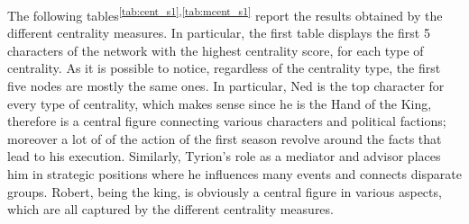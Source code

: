 \documentclass[10pt,twocolumn,letterpaper]{article}
\begin{document}
The following tables\textsuperscript{\ref{tab:cent_s1},\ref{tab:mcent_s1}} report the results obtained by the different centrality measures. In particular, the first table displays the first 5 characters of the network with the highest centrality score, for each type of centrality. As it is possible to notice, regardless of the centrality type, the first five nodes are mostly the same ones. In particular, Ned is the top character for every type of centrality, which makes sense since he is the Hand of the King, therefore is a central figure connecting various characters and political factions; moreover a lot of of the action of the first season revolve around the facts that lead to his execution. Similarly, Tyrion's role as a mediator and advisor places him in strategic positions where he influences many events and connects disparate groups. Robert, being the king, is obviously a central figure in various aspects, which are all captured by the different centrality measures. 
\end{document}
